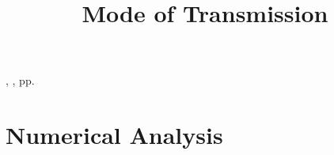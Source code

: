 \documentclass[12pt]{article}
\title{Mode of Transmission}
\date{} %
\begin{document}

\begin{htmlonly}
\href{\jref}{\jhead}, \jdate, pp.\
\end{htmlonly}

\maketitle
\thispagestyle{firstpage}



\newpage

\section{Numerical Analysis}
\end{document}
